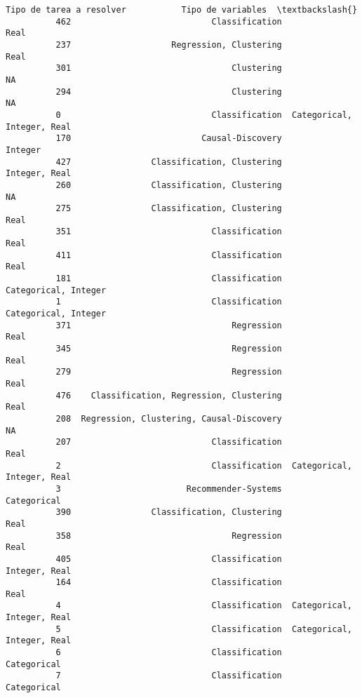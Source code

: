 \documentclass[11pt]{article}
\begin{document}
\begin{Verbatim}[commandchars=\\\{\}]
                               Tipo de tarea a resolver           Tipo de variables  \textbackslash{}
          462                            Classification                        Real   
          237                    Regression, Clustering                        Real   
          301                                Clustering                          NA   
          294                                Clustering                          NA   
          0                              Classification  Categorical, Integer, Real   
          170                          Causal-Discovery                     Integer   
          427                Classification, Clustering               Integer, Real   
          260                Classification, Clustering                          NA   
          275                Classification, Clustering                        Real   
          351                            Classification                        Real   
          411                            Classification                        Real   
          181                            Classification        Categorical, Integer   
          1                              Classification        Categorical, Integer   
          371                                Regression                        Real   
          345                                Regression                        Real   
          279                                Regression                        Real   
          476    Classification, Regression, Clustering                        Real   
          208  Regression, Clustering, Causal-Discovery                          NA   
          207                            Classification                        Real   
          2                              Classification  Categorical, Integer, Real   
          3                         Recommender-Systems                 Categorical   
          390                Classification, Clustering                        Real   
          358                                Regression                        Real   
          405                            Classification               Integer, Real   
          164                            Classification                        Real   
          4                              Classification  Categorical, Integer, Real   
          5                              Classification  Categorical, Integer, Real   
          6                              Classification                 Categorical   
          7                              Classification                 Categorical   

\end{Verbatim}
\end{document}
